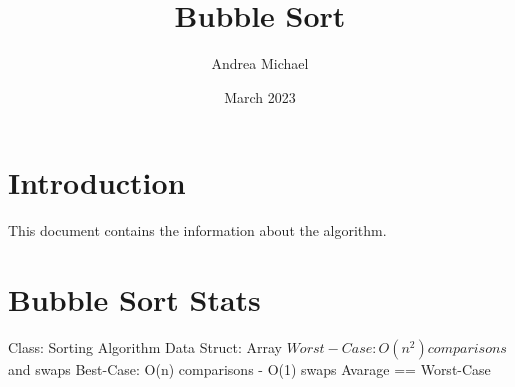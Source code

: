 \documentclass{article}
\title{Bubble Sort}
\author{Andrea Michael}
\date{March 2023}
\begin{document}
\maketitle

\section{Introduction}
This document contains the information about the algorithm.

\section{Bubble Sort Stats}
Class:		Sorting Algorithm\newline
Data Struct:	Array\newline
$Worst-Case:	O(n^2) comparisons$ and swaps\newline
Best-Case:	O(n) comparisons - O(1) swaps \newline
Avarage == Worst-Case\newline
\end{document}
